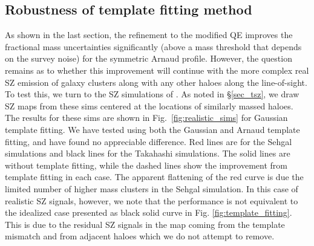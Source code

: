 \subsection{Robustness of template fitting method}
\label{subsec:simsz}

As shown in the last section, the refinement to the modified QE improves the fractional mass uncertainties significantly (above a mass threshold that depends on the survey noise) for the symmetric Arnaud profile. 
However, the question remains as to whether this improvement will continue with the more complex real SZ emission of galaxy clusters along with any other haloes along the line-of-sight.
To test this, we turn to the SZ simulations of \citet{sehgal10, takahashi17}. 
As noted in \S\ref{sec_tsz}, we draw SZ maps from these sims centered at the locations of similarly massed haloes. 
The results for these sims are shown in Fig.~\ref{fig:realistic_sims} for Gaussian template fitting. 
We have tested using both the Gaussian and Arnaud template fitting, and have found no appreciable difference. 
Red lines are for the Sehgal simulations and black lines for the Takahashi simulations. 
The solid lines are without template fitting, while the dashed lines show the improvement from template fitting in each case. 
 The apparent flattening of the red curve is due the limited number of higher mass clusters in the Sehgal simulation. 
 In this case of realistic SZ signals, however, we note that the performance is not equivalent to the idealized case presented as black solid curve in Fig. \ref{fig:template_fitting}. 
This is due to the residual SZ signals in the map coming from the template mismatch and from adjacent haloes which we do not attempt to remove.
 

